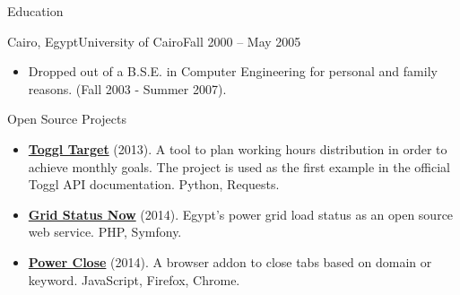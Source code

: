 \documentclass[]{mosabcv}
\begin{document}
	\begin{cvsection}{Education}
		\begin{cvsubsection}{Cairo, Egypt}{University of Cairo}{Fall 2000 -- May 2005}
			\begin{itemize}
				\item Dropped out of a B.S.E. in Computer Engineering for personal and family reasons. (Fall 2003 - Summer 2007).
			\end{itemize}
		\end{cvsubsection}
	\end{cvsection}

	\begin{cvsection}{Open Source Projects}
		\begin{cvsubsection}{}{}{}
			\begin{itemize}
				\item \textbf{\href{https://github.com/mos3abof/toggl_target}{Toggl Target}} (2013). A tool to plan working hours distribution in order to achieve monthly goals. The project is used as the first example in the official Toggl API documentation. Python, Requests.
			
				\item \textbf{\href{https://www.gridstatusnow.com}{Grid Status Now}} (2014). Egypt's power grid load status as an open source web service. PHP, Symfony.
				
				\item \textbf{\href{https://power-close.com/}{Power Close}} (2014). A browser addon to close tabs based on domain or keyword. JavaScript, Firefox, Chrome.
			\end{itemize}
		\end{cvsubsection}
	\end{cvsection}

\end{document}
